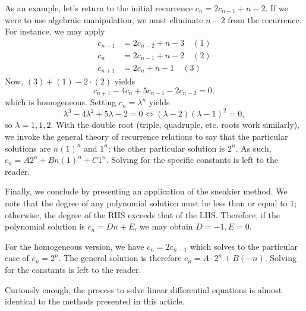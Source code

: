 \documentclass{article}
\begin{document}
As an example, let's return to the initial recurrence $c_n = 2c_{n-1} + n-2.$ If we were to use algebraic manipulation, we must eliminate $n-2$ from the recurrence. For instance, we may apply 
\begin{align*}
    c_{n-1} &= 2c_{n-2} + n-3 \quad(1) \\
    c_{n} &= 2c_{n-1} + n-2 \quad(2) \\
    c_{n+1} &= 2c_{n} + n-1 \quad(3)
\end{align*}
Now, $(3) + (1) - 2 \cdot (2)$ yields
\[ c_{n+1}-4c_{n}+5c_{n-1}-2c_{n-2} = 0, \]
which is homogeneous. Setting $c_n = \lambda^n$ yields
\[\lambda^3 - 4\lambda^2 + 5\lambda -2 = 0 \Longleftrightarrow (\lambda - 2)(\lambda-1)^2 = 0,\]
so $\lambda = 1,1,2$. With the double root (triple, quadruple, etc. roots work similarly), we invoke the general theory of recurrence relations to say that the particular solutions are $n(1)^n$ and $1^n$; the other particular solution is $2^n.$ As such, $c_n = A2^n + Bn(1)^n + C1^n$. Solving for the specific constants is left to the reader. 

Finally, we conclude by presenting an application of the sneakier method. We note that the degree of any polynomial solution must be less than or equal to $1$; otherwise, the degree of the RHS exceeds that of the LHS. Therefore, if the polynomial solution is $c_n = Dn + E$, we may obtain $D = -1, E = 0.$ 

For the homogeneous version, we have $c_n = 2c_{n-1}$ which solves to the particular case of $c_n = 2^n$. The general solution is therefore $c_n = A\cdot 2^n + B(-n).$ Solving for the constants is left to the reader.

Curiously enough, the process to solve linear differential equations is almost identical to the methods presented in this article. 
\end{document}

